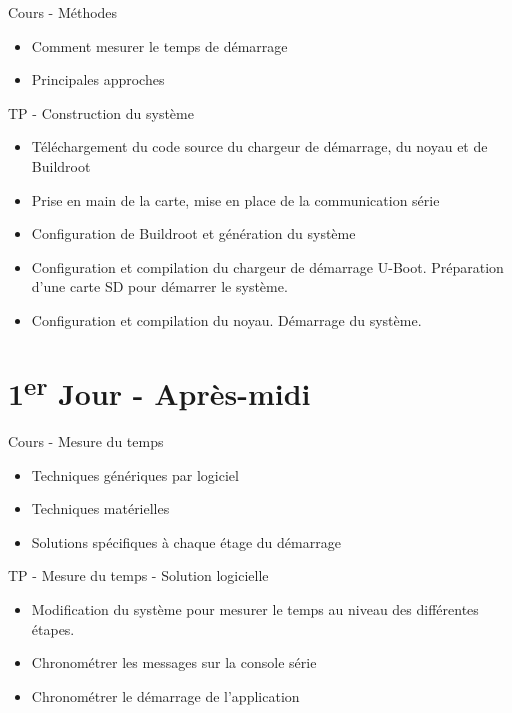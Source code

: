 \documentclass[a4paper,12pt,obeyspaces,spaces,hyphens]{article}
\begin{document}
\feagendatwocolumn
{Cours - Méthodes}
{
  \begin{itemize}
  \item Comment mesurer le temps de démarrage
  \item Principales approches
  \end{itemize}
}
{TP - Construction du système}
{
 \begin{itemize}
 \item Téléchargement du code source du chargeur de démarrage, du noyau et de Buildroot
 \item Prise en main de la carte, mise en place de la communication série
 \item Configuration de Buildroot et génération du système
 \item Configuration et compilation du chargeur de démarrage U-Boot. Préparation d'une
       carte SD pour démarrer le système.
 \item Configuration et compilation du noyau. Démarrage du système.
 \end{itemize}
}

\section{1\textsuperscript{er} Jour - Après-midi}

\feagendatwocolumn
{Cours - Mesure du temps}
{
  \begin{itemize}
  \item Techniques génériques par logiciel
  \item Techniques matérielles
  \item Solutions spécifiques à chaque étage du démarrage
  \end{itemize}
}
{TP - Mesure du temps - Solution logicielle}
{
 \begin{itemize}
 \item Modification du système pour mesurer le temps au niveau des différentes étapes.
 \item Chronométrer les messages sur la console série
 \item Chronométrer le démarrage de l'application
 \end{itemize}
}
\end{document}
